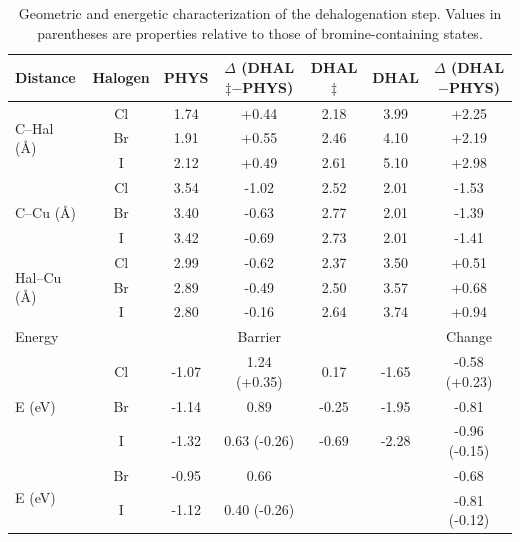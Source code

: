 \documentclass[%
 reprint,
 amsmath,amssymb,
 aps,
prb,
floatfix,
]{revtex4-2}
\begin{document}
{%






}

\begin{table}
\centering
\begin{tabular}{ lcccccc  }
 \hline
 \hline
 Distance & Halogen & \textbf{PHYS} & $\Delta$ (\textbf{DHAL$\ddagger$}$-$\textbf{PHYS}) & \textbf{DHAL$\ddagger$} & \textbf{DHAL} & $\Delta$ (\textbf{DHAL}$-$\textbf{PHYS}) \\ 
 \hline 
 \multirow{3}{*}{C--Hal (\si{\angstrom})} & Cl & 1.74 & +0.44 & 2.18 & 3.99 & +2.25\\ 
 & Br & 1.91 & +0.55 & 2.46 & 4.10 &+2.19 \\ 
 & I & 2.12 & +0.49 & 2.61 & 5.10 &+2.98 \\ 
 \hline
 \multirow{3}{*}{C--Cu (\si{\angstrom}) } & Cl & 3.54 & -1.02 & 2.52 & 2.01 & -1.53\\ 
 & Br & 3.40 & -0.63 & 2.77 & 2.01 & -1.39\\ 
 & I &3.42 &-0.69 & 2.73 & 2.01 & -1.41\\ 
 \hline
 \multirow{3}{*}{Hal--Cu (\si{\angstrom}) } & Cl & 2.99 & -0.62 & 2.37 & 3.50 & +0.51\\ 
 & Br & 2.89 & -0.49 & 2.50 & 3.57 & +0.68\\ 
 & I &2.80 &-0.16 & 2.64& 3.74 & +0.94\\ 
 \hline
 \hline
 Energy & & & Barrier & & & Change \\
 \hline
 \multirow{3}{*}{E (\si{\electronvolt}) } & Cl & -1.07 & 1.24 (+0.35) &0.17 &-1.65 & -0.58 (+0.23)\\ 
 & Br &-1.14 & 0.89 &-0.25 & -1.95& -0.81\\ 
 & I  & -1.32 & 0.63 (-0.26) & -0.69& -2.28& -0.96 (-0.15) \\ 
 \hline
 \multirow{2}{*}{E (\si{\electronvolt})~\cite{jacs2013}} & Br &-0.95 & 0.66 & & & -0.68 \\ 
 & I & -1.12& 0.40 (-0.26) & & & -0.81 (-0.12) \\ 
 \hline
 \hline
\end{tabular}
\caption{Geometric and energetic characterization of the dehalogenation step. Values in parentheses are properties relative to those of bromine-containing states.}
\label{table:bondlength}
\end{table}
\end{document}
